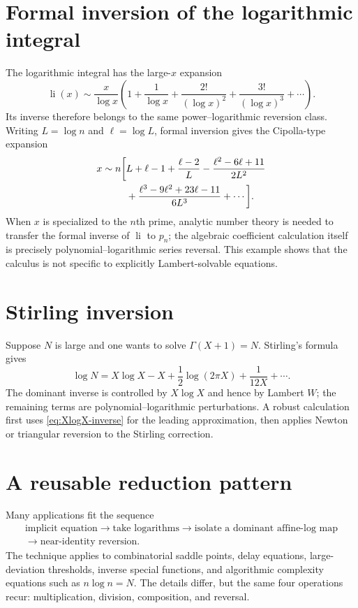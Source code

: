 \documentclass[11pt,oneside]{book}
\theoremstyle{definition}
\theoremstyle{remark}
\begin{document}
\section{Formal inversion of the logarithmic integral}
The logarithmic integral has the large-$x$ expansion
\begin{equation}\label{eq:li-expansion}
 \operatorname{li}(x)
 \sim\frac{x}{\log x}
 \left(1+\frac1{\log x}+\frac{2!}{(\log x)^2}
 +\frac{3!}{(\log x)^3}+\cdots\right).
\end{equation}
Its inverse therefore belongs to the same power--logarithmic reversion class.
Writing $L=\log n$ and $\ell=\log L$, formal inversion gives the Cipolla-type
expansion
\begin{align}\label{eq:nth-prime-formal}
 x\sim n\biggl[&L+\ell-1+\frac{\ell-2}{L}
 -\frac{\ell^2-6\ell+11}{2L^2}\\
 &+\frac{\ell^3-9\ell^2+23\ell-11}{6L^3}
 +\cdots\biggr].\notag
\end{align}
When $x$ is specialized to the $n$th prime, analytic number theory is needed
to transfer the formal inverse of $\operatorname{li}$ to $p_n$; the algebraic
coefficient calculation itself is precisely polynomial--logarithmic series
reversal.  This example shows that the calculus is not specific to explicitly
Lambert-solvable equations.

\section{Stirling inversion}
Suppose $N$ is large and one wants to solve $\Gamma(X+1)=N$.  Stirling's
formula gives
\[
 \log N=X\log X-X+\frac12\log(2\pi X)
 +\frac1{12X}+\cdots.
\]
The dominant inverse is controlled by $X\log X$ and hence by Lambert $W$;
the remaining terms are polynomial--logarithmic perturbations.  A robust
calculation first uses \eqref{eq:XlogX-inverse} for the leading approximation,
then applies Newton or triangular reversion to the Stirling correction.

\section{A reusable reduction pattern}
Many applications fit the sequence
\[
 \begin{gathered}
 \text{implicit equation}
 \longrightarrow \text{take logarithms}
 \longrightarrow \text{isolate a dominant affine-log map}\\
 \longrightarrow \text{near-identity reversion}.
 \end{gathered}
\]
The technique applies to combinatorial saddle points, delay equations,
large-deviation thresholds, inverse special functions, and algorithmic
complexity equations such as $n\log n=N$.  The details differ, but the same
four operations recur: multiplication, division, composition, and reversal.
\end{document}
